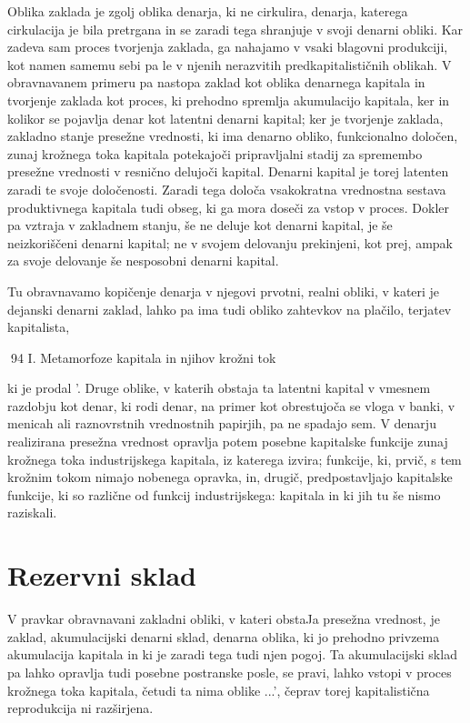 \documentclass[kapital_02.tex]{subfiles}
\begin{document}
Oblika zaklada je zgolj oblika denarja, ki ne cirkulira, denarja, katerega cirkulacija je bila pretrgana in se zaradi tega shranjuje v svoji denarni obliki. Kar zadeva sam proces tvorjenja zaklada, ga nahajamo v vsaki blagovni produkciji, kot namen samemu sebi pa le v njenih nerazvitih predkapitalističnih oblikah. V obravnavanem primeru pa nastopa zaklad kot oblika denarnega kapitala in tvorjenje zaklada kot proces, ki prehodno spremlja akumulacijo kapitala, ker in kolikor se pojavlja denar kot latentni denarni kapital; ker je tvorjenje zaklada, zakladno stanje presežne vrednosti, ki ima denarno obliko, funkcionalno določen, zunaj krožnega toka kapitala potekajoči pripravljalni stadij za spremembo presežne vrednosti v resnično delujoči kapital. Denarni kapital je torej latenten zaradi te svoje določenosti. Zaradi tega določa vsakokratna vrednostna sestava produktivnega kapitala tudi obseg, ki ga mora doseči za vstop v proces. Dokler pa vztraja v zakladnem stanju, še ne deluje kot denarni kapital, je še neizkoriščeni denarni kapital; ne v svojem delovanju prekinjeni, kot prej, ampak za svoje delovanje še nesposobni denarni kapital.

Tu obravnavamo kopičenje denarja v njegovi prvotni, realni obliki, v kateri je dejanski denarni zaklad, lahko pa ima tudi obliko zahtevkov na plačilo, terjatev kapitalista,



94 I. Metamorfoze kapitala in njihov krožni tok



 ki je prodal \KPEB'. Druge oblike, v katerih obstaja ta latentni kapital v vmesnem razdobju kot denar, ki rodi denar, na primer kot obrestujoča se vloga v banki, v menicah ali raznovrstnih vrednostnih papirjih, pa ne spadajo sem. V denarju realizirana presežna vrednost opravlja potem posebne kapitalske funkcije zunaj krožnega toka industrijskega kapitala, iz katerega izvira; funkcije, ki, prvič, s tem krožnim tokom nimajo nobenega opravka, in, drugič, predpostavljajo kapitalske funkcije, ki so različne od funkcij industrijskega: kapitala in ki jih tu še nismo raziskali.

\section{Rezervni sklad}

V pravkar obravnavani zakladni obliki, v kateri obstaJa presežna vrednost, je zaklad, akumulacijski denarni sklad, denarna oblika, ki jo prehodno privzema akumulacija kapitala in ki je zaradi tega tudi njen pogoj. Ta akumulacijski sklad pa lahko opravlja tudi posebne postranske posle, se pravi, lahko vstopi v proces krožnega toka kapitala, četudi ta nima oblike \KPEP...\KPEP', čeprav torej kapitalistična reprodukcija ni razširjena.
\end{document}
